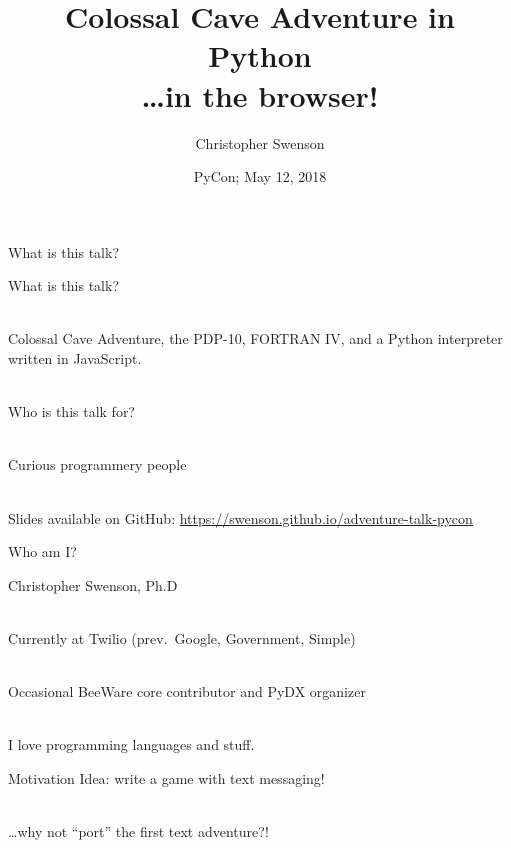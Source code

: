 \documentclass{beamer}
\title[Adventure]{Colossal Cave Adventure in Python\\ \dots in the browser!}
\author[@chris\_{}swenson]{Christopher Swenson}
\date[PyCon 2018]{PyCon; May 12, 2018}
\begin{document}
\begin{frame}
\titlepage
\end{frame}

\begin{frame}{What is this talk?}

What is this talk?

\ \\
Colossal Cave Adventure, the PDP-10, FORTRAN IV, and a Python interpreter written in JavaScript.

\ \\

Who is this talk for?

\ \\

Curious programmery people

\ \\

Slides available on GitHub:
\url{https://swenson.github.io/adventure-talk-pycon}

\end{frame}

\begin{frame}{Who am I?}



Christopher Swenson, Ph.D

\ \\

Currently at Twilio (prev.\ Google, Government, Simple)

\ \\

Occasional BeeWare core contributor and PyDX organizer

\ \\

I love programming languages and stuff.

\end{frame}

\begin{frame}{Motivation}
Idea: write a game with text messaging!

\ \\

\dots why not ``port'' the first text adventure?!

\end{frame}
\end{document}
